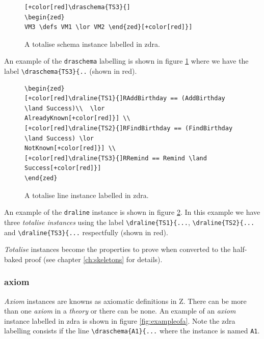 \begin{figure}[H]
\centering
\begin{footnotesize}
\begin{BVerbatim}[commandchars=+\[\]]
[+color[red]\draschema{TS3}{]
\begin{zed}
VM3 \defs VM1 \lor VM2 \end{zed}[+color[red]}]
\end{BVerbatim}
\end{footnotesize}
\caption{\label{fig:exampleofts1} A totalise schema instance labelled in \gls{zdra}.}
\end{figure}

An example of the \verb|draschema| labelling is shown in figure
\ref{fig:exampleofts1} where we have the label \verb|\draschema{TS3}{..| (shown
in red).

\begin{figure}[H]
\centering
\begin{footnotesize}
\begin{BVerbatim}[commandchars=+\[\]]
\begin{zed} 
[+color[red]\draline{TS1}{]RAddBirthday == (AddBirthday \land Success)\\  \lor
AlreadyKnown[+color[red]}] \\
[+color[red]\draline{TS2}{]RFindBirthday == (FindBirthday \land Success) \lor
NotKnown[+color[red]}] \\
[+color[red]\draline{TS3}{]RRemind == Remind \land Success[+color[red]}]
\end{zed}
\end{BVerbatim}
\end{footnotesize}
\caption{\label{fig:exampleofts2} A totalise line instance labelled in \gls{zdra}.}
\end{figure}

An example of the \verb|draline| instance is shown in figure \ref{fig:exampleofts2}. In this example we have three \emph{totalise instances}
using the label \verb|\draline{TS1}{...|, \verb|\draline{TS2}{...| and
\verb|\draline{TS3}{...| respectfully (shown in red).

\emph{Totalise} instances become the properties to prove when converted to the
half-baked proof (see chapter \ref{ch:skeletons} for details).


\subsubsection{axiom}

\emph{Axiom} instances are knowns as axiomatic definitions in Z. There can be
more than one \emph{axiom} in a \emph{theory} or there can be none. An example
of an \emph{axiom} instance labelled in \gls{zdra} is shown in figure
\ref{fig:exampleofa}. Note the \gls{zdra} labelling consists if the line
\verb|\draschema{A1}{...| where the instance is named \verb|A1|.


